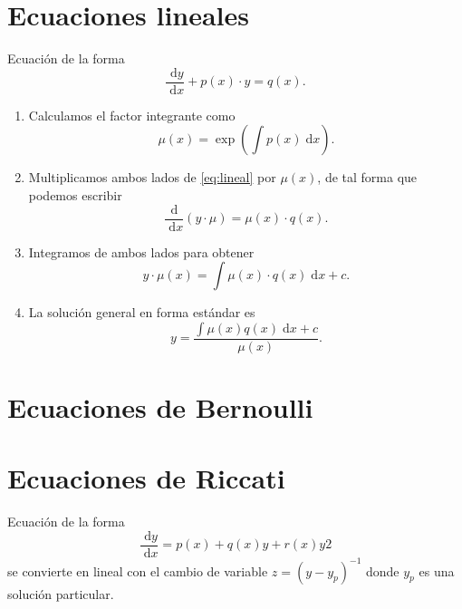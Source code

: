 \documentclass[a4paper]{article}
\newcommand{\dif}[1]{\;\mathrm{d}#1}
\begin{document}
\section{Ecuaciones lineales}
Ecuación de la forma
\begin{equation}
    \label{eq:lineal}
    \frac{\dif{y}}{\dif{x}} + p(x) \cdot y = q(x).
\end{equation}

\begin{enumerate}
    \item Calculamos el factor integrante como
    \begin{equation*}
        \mu(x) = \exp \left( \int p(x) \dif{x} \right).
    \end{equation*}

    \item Multiplicamos ambos lados de \eqref{eq:lineal} por $\mu(x)$, de tal forma que podemos escribir
    \begin{equation*}
        \frac{\mathrm{d}}{\dif{x}} \left( y \cdot \mu \right) = \mu(x) \cdot q(x).
    \end{equation*}

    \item Integramos de ambos lados para obtener
    \begin{equation*}
        y \cdot \mu(x) = \int \mu(x) \cdot q(x) \dif{x} + c.
    \end{equation*}

    \item La solución general en forma estándar es
    \begin{equation*}
        y = \frac{\int \mu(x) q(x) \dif{x} + c }{\mu(x)}.
    \end{equation*}
\end{enumerate}

\section{Ecuaciones de Bernoulli}

\section{Ecuaciones de Riccati}
Ecuación de la forma
\begin{equation}
    \label{eq:riccati}
    \frac{\dif{y}}{\dif{x}} = p(x) + q(x)y + r(x)y 2
\end{equation}
se convierte en lineal con el cambio de variable $z = (y - y_p)^{-1}$ donde $y_{p}$ es una solución particular.
\end{document}
